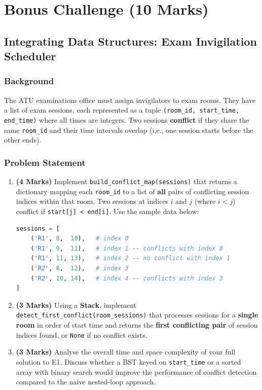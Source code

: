 \documentclass[11pt,a4paper]{article}
\begin{document}
\section{Bonus Challenge (10 Marks)}
\subsection*{Integrating Data Structures: Exam Invigilation Scheduler}

\subsubsection*{Background}
The ATU examinations office must assign invigilators to exam rooms. They have a list of exam sessions, each represented as a tuple \texttt{(room\_id, start\_time, end\_time)} where all times are integers. Two sessions \textbf{conflict} if they share the same \texttt{room\_id} and their time intervals overlap (i.e., one session starts before the other ends).

\subsubsection*{Problem Statement}
\begin{enumerate}[label=\textbf{E\arabic*.}]
    \item \textbf{(4 Marks)} Implement \texttt{build\_conflict\_map(sessions)} that returns a dictionary mapping each \texttt{room\_id} to a list of \textbf{all} pairs of conflicting session indices within that room. Two sessions at indices $i$ and $j$ (where $i < j$) conflict if \texttt{start[j] < end[i]}. Use the sample data below:
    \begin{lstlisting}[language=Python]
sessions = [
    ('R1', 8,  10),   # index 0
    ('R1', 9,  11),   # index 1 -- conflicts with index 0
    ('R1', 11, 13),   # index 2 -- no conflict with index 1
    ('R2', 8,  12),   # index 3
    ('R2', 10, 14),   # index 4 -- conflicts with index 3
]
    \end{lstlisting}

    \item \textbf{(3 Marks)} Using a \textbf{Stack}, implement \texttt{detect\_first\_conflict(room\_sessions)} that processes sessions for a \textbf{single room} in order of start time and returns the \textbf{first conflicting pair} of session indices found, or \texttt{None} if no conflict exists.

    \item \textbf{(3 Marks)} Analyse the overall time and space complexity of your full solution to E1. Discuss whether a BST keyed on \texttt{start\_time} or a sorted array with binary search would improve the performance of conflict detection compared to the naive nested-loop approach.
\end{enumerate}
\end{document}

